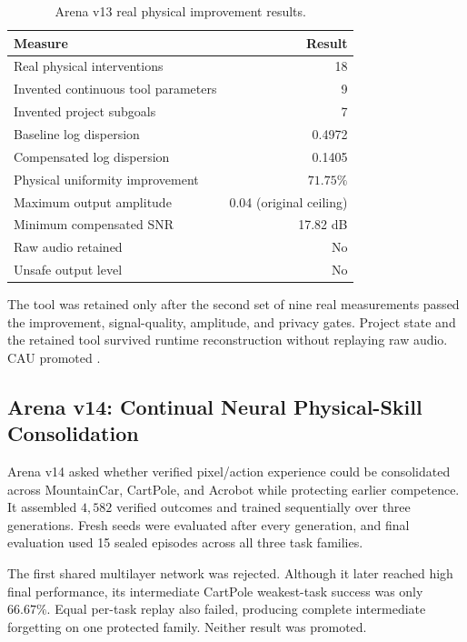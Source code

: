 \begin{table}[htbp]
\centering
\caption{Arena v13 real physical improvement results.}
\label{tab:arena-v13-results}
\begin{tabular}{lr}
\hline
Measure & Result \\
\hline
Real physical interventions & 18 \\
Invented continuous tool parameters & 9 \\
Invented project subgoals & 7 \\
Baseline log dispersion & 0.4972 \\
Compensated log dispersion & 0.1405 \\
Physical uniformity improvement & $71.75\%$ \\
Maximum output amplitude & 0.04 (original ceiling) \\
Minimum compensated SNR & 17.82 dB \\
Raw audio retained & No \\
Unsafe output level & No \\
\hline
\end{tabular}
\end{table}

The tool was retained only after the second set of nine real measurements
passed the improvement, signal-quality, amplitude, and privacy gates.  Project
state and the retained tool survived runtime reconstruction without replaying
raw audio.  CAU promoted
.

\subsection{Arena v14: Continual Neural Physical-Skill Consolidation}
\label{subsec:arena-v14-neural-consolidation}

Arena v14 asked whether verified pixel/action experience could be consolidated
across MountainCar, CartPole, and Acrobot while protecting earlier competence.
It assembled $4{,}582$ verified outcomes and trained sequentially over three
generations.  Fresh seeds were evaluated after every generation, and final
evaluation used 15 sealed episodes across all three task families.

The first shared multilayer network was rejected.  Although it later reached
high final performance, its intermediate CartPole weakest-task success was only
$66.67\%$.  Equal per-task replay also failed, producing complete intermediate
forgetting on one protected family.  Neither result was promoted.

